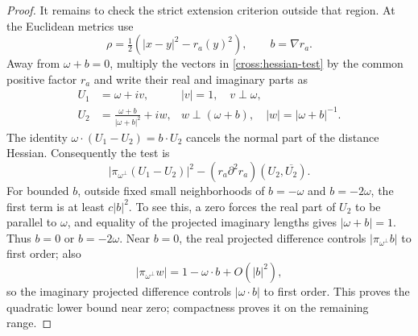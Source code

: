 \begin{proof}
It remains to check the strict extension criterion outside that region.
At the Euclidean metrics use
\[
 \rho=\tfrac12(|x-y|^2-r_a(y)^2),\qquad b=\nabla r_a.
\]
Away from $\omega+b=0$, multiply the vectors in
\eqref{cross:hessian-test} by the common positive factor $r_a$ and
write their real and imaginary parts as
\begin{equation}\label{cross:null-vectors}
 \begin{aligned}
 U_1&=\omega+iv,& |v|=1,\quad v\perp\omega,\\
 U_2&=\frac{\omega+b}{|\omega+b|^2}+iw,
 &w\perp(\omega+b),\quad |w|=|\omega+b|^{-1}.
 \end{aligned}
\end{equation}
The identity $\omega\cdot(U_1-U_2)=b\cdot U_2$ cancels the normal
part of the distance Hessian.  Consequently the test is
\begin{equation}\label{cross:tube-test}
 \big|\pi_{\omega^\perp}(U_1-U_2)\big|^2
 -(r_a\partial^2r_a)(U_2,\overline{U_2}).
\end{equation}
For bounded $b$, outside fixed small neighborhoods of
$b=-\omega$ and $b=-2\omega$, the first term is at least $c|b|^2$.
To see this, a zero forces the real part of $U_2$ to be parallel to
$\omega$, and equality of the projected imaginary lengths gives
$|\omega+b|=1$.  Thus $b=0$ or $b=-2\omega$.
Near $b=0$, the real projected difference controls
$|\pi_{\omega^\perp}b|$ to first order; also
\[
 |\pi_{\omega^\perp}w|
 =1-\omega\cdot b+O(|b|^2),
\]
so the imaginary projected difference controls $|\omega\cdot b|$
to first order.  This proves the quadratic lower bound near zero;
compactness proves it on the remaining range.


\end{proof}
